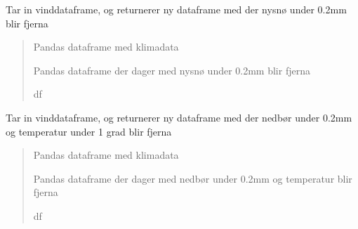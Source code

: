 \documentclass[letterpaper,10pt,norsk]{sphinxmanual}
\begin{document}

\begin{fulllineitems}
\label{\detokenize{index:klimadata.klimadata.vind_sno_fsw}}
\pysigstartsignatures
{}
\pysigstopsignatures
\sphinxAtStartPar
Tar in vinddataframe, og returnerer ny dataframe med der nysnø under 0.2mm blir fjerna
\begin{quote}\begin{description}
\sphinxAtStartPar
{} \textendash{} Pandas dataframe med klimadata

\sphinxAtStartPar
Pandas dataframe der dager med nysnø under 0.2mm blir fjerna

\sphinxAtStartPar
df

\end{description}\end{quote}

\end{fulllineitems}


\begin{fulllineitems}
\label{\detokenize{index:klimadata.klimadata.vind_sno_rr_tm}}
\pysigstartsignatures
{}
\pysigstopsignatures
\sphinxAtStartPar
Tar in vinddataframe, og returnerer ny dataframe med der nedbør under 0.2mm og temperatur under 1 grad blir fjerna
\begin{quote}\begin{description}
\sphinxAtStartPar
{} \textendash{} Pandas dataframe med klimadata

\sphinxAtStartPar
Pandas dataframe der dager med nedbør under 0.2mm og temperatur blir fjerna

\sphinxAtStartPar
df

\end{description}\end{quote}

\end{fulllineitems}
\end{document}
